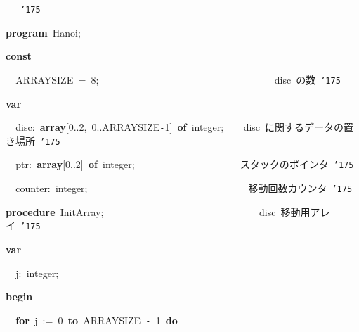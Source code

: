 \documentclass{article}
\begin{document}
\noindent
\mbox{}\hfill

\noindent
\mbox{}\ \  \hrulefill  \rm\mc \ {\tt\char'175}
\tt\mc 

\noindent
\mbox{}\hfill

\noindent
\mbox{}{\textbf{p}}{\textbf{r}}{\textbf{o}}{\textbf{g}}{\textbf{r}}{\textbf{a}}{\textbf{m}}{\tt\mc \ }Hanoi;

\noindent
\mbox{}\hfill

\noindent
\mbox{}{\textbf{c}}{\textbf{o}}{\textbf{n}}{\textbf{s}}{\textbf{t}}

\noindent
\mbox{}{\tt\mc \ \ }ARRAYSIZE{\tt\mc \ }={\tt\mc \ }8;{\tt\mc \ \ \ \ \ \ \ \ \ \ \ \ \ \ \ \ \ \ \ \ \ \ \ \ \ \ \ \ \ \ \ \ \ \ }\rm{}\ disc\ の数\ {\tt\char'175}
\tt\mc 

\noindent
\mbox{}\hfill

\noindent
\mbox{}{\textbf{v}}{\textbf{a}}{\textbf{r}}

\noindent
\mbox{}{\tt\mc \ \ }disc:{\tt\mc \ }{\textbf{a}}{\textbf{r}}{\textbf{r}}{\textbf{a}}{\textbf{y}}[0..2,{\tt\mc \ }0..ARRAYSIZE{\tt -}1]{\tt\mc \ }{\textbf{o}}{\textbf{f}}{\tt\mc \ }integer;{\tt\mc \ \ \ }\rm{}\ disc\ に関するデータの置き場所\ {\tt\char'175}
\tt\mc 

\noindent
\mbox{}{\tt\mc \ \ }ptr:{\tt\mc \ }{\textbf{a}}{\textbf{r}}{\textbf{r}}{\textbf{a}}{\textbf{y}}[0..2]{\tt\mc \ }{\textbf{o}}{\textbf{f}}{\tt\mc \ }integer;{\tt\mc \ \ \ \ \ \ \ \ \ \ \ \ \ \ \ \ \ \ \ \ }\rm{}\ スタックのポインタ\ {\tt\char'175}
\tt\mc 

\noindent
\mbox{}{\tt\mc \ \ }counter:{\tt\mc \ }integer;{\tt\mc \ \ \ \ \ \ \ \ \ \ \ \ \ \ \ \ \ \ \ \ \ \ \ \ \ \ \ \ \ \ \ }\rm{}\ 移動回数カウンタ\ {\tt\char'175}
\tt\mc 

\noindent
\mbox{}\hfill

\noindent
\mbox{}{\textbf{p}}{\textbf{r}}{\textbf{o}}{\textbf{c}}{\textbf{e}}{\textbf{d}}{\textbf{u}}{\textbf{r}}{\textbf{e}}{\tt\mc \ }InitArray;{\tt\mc \ \ \ \ \ \ \ \ \ \ \ \ \ \ \ \ \ \ \ \ \ \ \ \ \ \ \ \ \ \ }\rm{}\ disc\ 移動用アレイ\ {\tt\char'175}
\tt\mc 

\noindent
\mbox{}{\textbf{v}}{\textbf{a}}{\textbf{r}}

\noindent
\mbox{}{\tt\mc \ \ }j:{\tt\mc \ }integer;

\noindent
\mbox{}{\textbf{b}}{\textbf{e}}{\textbf{g}}{\textbf{i}}{\textbf{n}}

\noindent
\mbox{}{\tt\mc \ \ }{\textbf{f}}{\textbf{o}}{\textbf{r}}{\tt\mc \ }j{\tt\mc \ }:={\tt\mc \ }0{\tt\mc \ }{\textbf{t}}{\textbf{o}}{\tt\mc \ }ARRAYSIZE{\tt\mc \ }{\tt -}{\tt\mc \ }1{\tt\mc \ }{\textbf{d}}{\textbf{o}}
\end{document}
